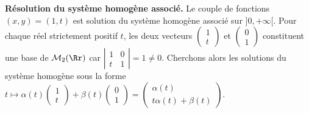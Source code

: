 {\begin{enumerate}
{\textbf{Résolution du système homogène associé.} Le couple de fonctions $(x,y)=(1,t)$ est solution du système homogène associé sur $]0,+\infty[$. Pour chaque réel strictement positif $t$, les deux vecteurs $\left(
\begin{array}{c}
1\\
t
\end{array}
\right)$ et $\left(
\begin{array}{c}
0\\
1
\end{array}
\right)$ constituent une base de $\mathcal{M}_2(\Rr)$ car $\left|
\begin{array}{cc}
1&0\\
t&1
\end{array}
\right|=1\neq0$. Cherchons alors les solutions du système homogène sous la forme $t\mapsto\alpha(t)\left(
\begin{array}{c}
1\\
t
\end{array}
\right)+\beta(t)\left(
\begin{array}{c}
0\\
1
\end{array}
\right)=\left(
\begin{array}{c}
\alpha(t)\\
t\alpha(t)+\beta(t)
\end{array}
\right)$.

}
\end{enumerate}}
